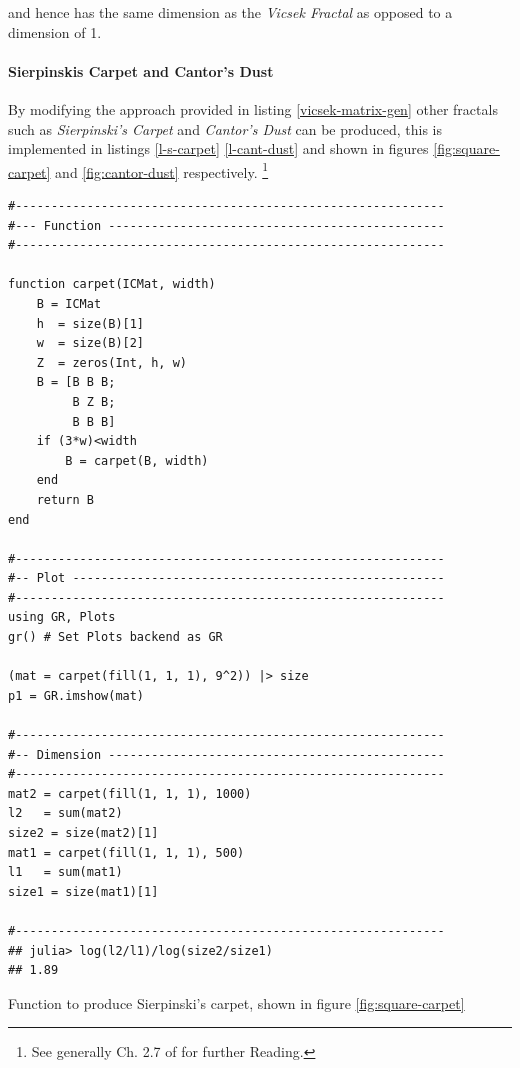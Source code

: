 \documentclass[a4paper,11pt,twoside]{article}
\begin{document}
and hence has the same dimension as the \emph{Vicsek Fractal} as opposed to a
dimension of 1.

\paragraph{Sierpinskis Carpet and Cantor's Dust}
\label{sec:orgd14a38d}
By modifying the approach provided in listing \ref{vicsek-matrix-gen} other fractals
such as \emph{Sierpinski's Carpet} and \emph{Cantor's Dust} can be produced, this is
implemented in listings \ref{l-s-carpet} \ref{l-cant-dust} and shown in figures
\ref{fig:square-carpet} and \ref{fig:cantor-dust} respectively. \footnote{See generally Ch. 2.7 of \cite[\S 2.7]{peitgenChaosFractalsNew2004} for further Reading.}

\begin{listing}[htbp]
\begin{verbatim}
#------------------------------------------------------------
#--- Function -----------------------------------------------
#------------------------------------------------------------

function carpet(ICMat, width)
    B = ICMat
    h  = size(B)[1]
    w  = size(B)[2]
    Z  = zeros(Int, h, w)
    B = [B B B;
         B Z B;
         B B B]
    if (3*w)<width
        B = carpet(B, width)
    end
    return B
end

#------------------------------------------------------------
#-- Plot ----------------------------------------------------
#------------------------------------------------------------
using GR, Plots
gr() # Set Plots backend as GR

(mat = carpet(fill(1, 1, 1), 9^2)) |> size
p1 = GR.imshow(mat)

#------------------------------------------------------------
#-- Dimension -----------------------------------------------
#------------------------------------------------------------
mat2 = carpet(fill(1, 1, 1), 1000)
l2   = sum(mat2)
size2 = size(mat2)[1]
mat1 = carpet(fill(1, 1, 1), 500)
l1   = sum(mat1)
size1 = size(mat1)[1]

#------------------------------------------------------------
## julia> log(l2/l1)/log(size2/size1)
## 1.89
\end{verbatim}
\caption{\label{l-s-carpet}Function to produce Sierpinski's carpet, shown in figure \ref{fig:square-carpet}}
\end{listing}
\end{document}
